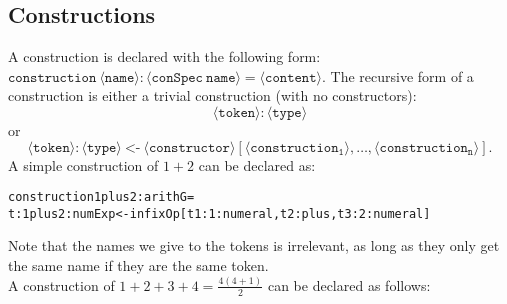 \documentclass[a4paper]{article}
\theoremstyle{definition}
\begin{document}
	\subsection{Constructions}
	A construction is declared with the following form: $\mathtt{construction\ \langle name\rangle : \langle conSpec\ name\rangle = \langle content\rangle}$. The recursive form of a construction is either a trivial construction (with no constructors): $$\mathtt{\langle token\rangle :\langle type\rangle}$$ or $$\mathtt{\langle token\rangle :\langle type\rangle\  {\texttt{<-}}\  \langle constructor\rangle[\langle construction_1\rangle,\ldots,\langle construction_n\rangle]}.$$
	A simple construction of $1+2$ can be declared as:
	\begin{alltt}
construction 1plus2:arithG =
    t:1plus2:numExp <- infixOp[t1:1:numeral, t2:plus, t3:2:numeral]
	\end{alltt}
	Note that the names we give to the tokens is irrelevant, as long as they only get the same name if they are the same token.\\[0.2cm]
	A construction of $1+2+3+4=\frac{4(4+1)}{2}$ can be declared as follows:\\[0.3cm]
\end{document}
